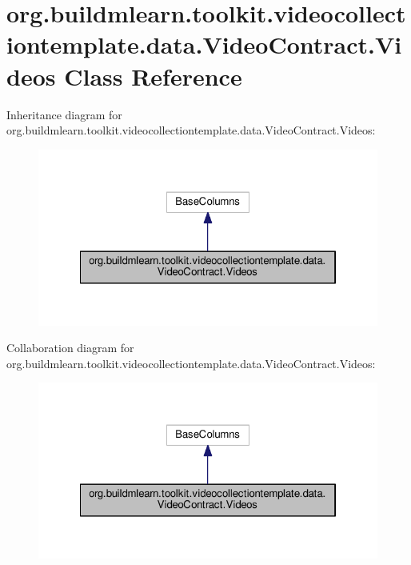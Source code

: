 \hypertarget{classorg_1_1buildmlearn_1_1toolkit_1_1videocollectiontemplate_1_1data_1_1VideoContract_1_1Videos}{}\section{org.\+buildmlearn.\+toolkit.\+videocollectiontemplate.\+data.\+Video\+Contract.\+Videos Class Reference}
\label{classorg_1_1buildmlearn_1_1toolkit_1_1videocollectiontemplate_1_1data_1_1VideoContract_1_1Videos}


Inheritance diagram for org.\+buildmlearn.\+toolkit.\+videocollectiontemplate.\+data.\+Video\+Contract.\+Videos\+:
\nopagebreak
\begin{figure}[H]
\begin{center}
\leavevmode
\includegraphics[width=322pt]{classorg_1_1buildmlearn_1_1toolkit_1_1videocollectiontemplate_1_1data_1_1VideoContract_1_1Videos__inherit__graph}
\end{center}
\end{figure}


Collaboration diagram for org.\+buildmlearn.\+toolkit.\+videocollectiontemplate.\+data.\+Video\+Contract.\+Videos\+:
\nopagebreak
\begin{figure}[H]
\begin{center}
\leavevmode
\includegraphics[width=322pt]{classorg_1_1buildmlearn_1_1toolkit_1_1videocollectiontemplate_1_1data_1_1VideoContract_1_1Videos__coll__graph}
\end{center}
\end{figure}
